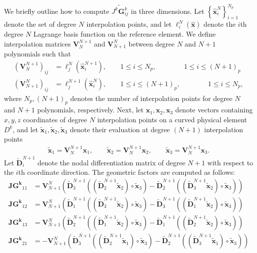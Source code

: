 \documentclass[preprint,10pt]{article}
\theoremstyle{definition}
\theoremstyle{lemma}
\theoremstyle{theorem}
\theoremstyle{assumption}
\renewcommand{\hat}{\widehat}
\renewcommand{\tilde}{\widetilde}
\newcommand{\LRp}[1]{\left( #1 \right)}
\newcommand{\LRc}[1]{\left\{ #1 \right\}}
\begin{document}
{We briefly outline how to compute $\tilde{J^k\bm{G}^k_{ij}}$ in three dimensions.  Let $\LRc{\hat{\bm{x}}^N_i}_{i=1}^{N_p}$ denote the set of degree $N$ interpolation points, and let $\ell^N_i(\hat{\bm{x}})$ denote the $i$th degree $N$ Lagrange basis function on the reference element.  We define interpolation matrices $\bm{V}_N^{N+1}$ and $\bm{V}^N_{N+1}$ between degree $N$ and $N+1$ polynomials such that 
\begin{align}
\LRp{\bm{V}_N^{N+1}}_{ij} &= \ell^N_j(\hat{\bm{x}}^{N+1}_i) , \qquad 1\leq i \leq N_p, \qquad \qquad 1\leq i \leq (N+1)_p\\
\LRp{\bm{V}^N_{N+1}}_{ij} &= \ell^{N+1}_j(\hat{\bm{x}}^{N}_i) , \qquad 1\leq i \leq (N+1)_p, \qquad \qquad 1\leq i \leq N_p, \nonumber
\end{align}
where $N_p, (N+1)_p$ denotes the number of interpolation points for degree $N$ and $N+1$ polynomials, respectively.  Next, let $\bm{x}_1,\bm{x}_2,\bm{x}_3$ denote vectors containing $x,y,z$ coordinates of degree $N$ interpolation points on a curved physical element $D^k$, and let $\tilde{\bm{x}}_1,\tilde{\bm{x}}_2,\tilde{\bm{x}}_3$ denote their evaluation at degree $(N+1)$ interpolation points
\begin{align}
\tilde{\bm{x}}_1 = \bm{V}_N^{N+1}\bm{x}_1, \qquad \tilde{\bm{x}}_2 = \bm{V}_N^{N+1}\bm{x}_2, \qquad \tilde{\bm{x}}_3 = \bm{V}_N^{N+1}\bm{x}_3.
\end{align}
Let $\tilde{\bm{D}}^{N+1}_i$ denote the nodal differentiation matrix of degree $N+1$ with respect to the $i$th coordinate direction.  The geometric factors are computed as follows:
\begin{align}
\bm{JG^k}_{11} &= \bm{V}_{N+1}^N\LRp{\tilde{\bm{D}}^{N+1}_3 \LRp{\LRp{ \tilde{\bm{D}}^{N+1}_2 \tilde{\bm{x}}_2} \circ\tilde{\bm{x}}_3} - \tilde{\bm{D}}^{N+1}_2 \LRp{ \LRp{\tilde{\bm{D}}^{N+1}_3\tilde{\bm{x}}_2} \circ\tilde{\bm{x}}_3}} \\
\bm{JG^k}_{12} &= \bm{V}_{N+1}^N\LRp{\tilde{\bm{D}}^{N+1}_1 \LRp{ \LRp{\tilde{\bm{D}}^{N+1}_3\tilde{\bm{x}}_2} \circ\tilde{\bm{x}}_3} - \tilde{\bm{D}}^{N+1}_3 \LRp{ \LRp{\tilde{\bm{D}}^{N+1}_1\tilde{\bm{x}}_2 }\circ\tilde{\bm{x}}_3}} \nonumber\\
\bm{JG^k}_{13} &= \bm{V}_{N+1}^N{\LRp{\tilde{\bm{D}}^{N+1}_2 \LRp{\LRp{ \tilde{\bm{D}}^{N+1}_1\tilde{\bm{x}}_2} \circ\tilde{\bm{x}}_3} - \tilde{\bm{D}}^{N+1}_1 \LRp{\LRp{ \tilde{\bm{D}}^{N+1}_2\tilde{\bm{x}}_2} \circ\tilde{\bm{x}}_3}}} \nonumber\\
%
\bm{JG^k}_{21} &= -\bm{V}_{N+1}^N\LRp{\tilde{\bm{D}}^{N+1}_3 \LRp{\LRp{ \tilde{\bm{D}}^{N+1}_2 \tilde{\bm{x}}_1} \circ\tilde{\bm{x}}_3} - \tilde{\bm{D}}^{N+1}_2 \LRp{\LRp{ \tilde{\bm{D}}^{N+1}_3\tilde{\bm{x}}_1} \circ\tilde{\bm{x}}_3}} \nonumber \\

\end{align}}
\end{document}
